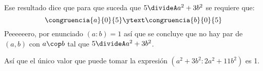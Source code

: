 Ese resultado dice que para que suceda que $ 5 \divideA a^2 + 3b^2$ se requiere que:
$$
  \congruencia{a}{0}{5}
  \ytext
  \congruencia{b}{0}{5}
$$
Peeeeeero, por enunciado $(a:b) = 1$ así que se concluye que no hay par de $(a,b)$ con $a\cop b$ tal que $ 5 \divideA a^2 + 3b^2$.

\bigskip

Así que el único valor que puede tomar la expresión $(a^2+3b^2 : 2a^2 + 11b^2)$ es 1.

\begin{aportes}
  \item {}
  \item {}
\end{aportes}
